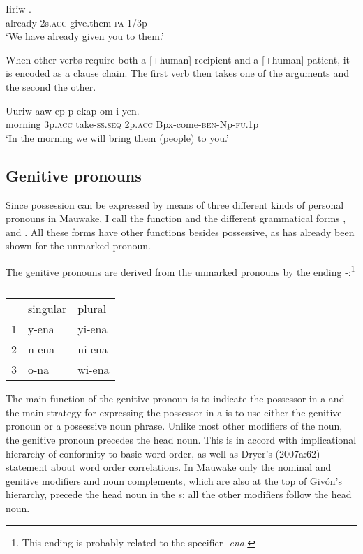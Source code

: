 \ea%
\label{ex:x565}
\gll Iiriw  . \\
already 2s.\textsc{acc} give.them-\textsc{pa}-1/3p\\
\glt`We have already given you to them.'
\z

When other verbs require both a [+human] recipient and a [+human] patient, it is encoded as a clause chain. The first verb then takes one of the arguments and the second the other.

\ea%
\label{ex:x566}
\gll Uuriw  aaw-ep  p-ekap-om-i-yen. \\
morning 3p.\textsc{acc} take-\textsc{ss}.\textsc{seq} 2p.\textsc{acc} Bpx-come-\textsc{ben}-Np-\textsc{fu}.1p\\
\glt`In the morning we will bring them (people) to you.'
\z

\subsection{Genitive pronouns}
{}
Since possession can be expressed by means of three different kinds of personal pronouns in Mauwake, I call the function  and the different grammatical forms , \textstyleDefinedWords{} and . All these forms have other functions besides possessive, as has already been shown for the unmarked pronoun. 

The genitive pronouns are derived from the unmarked pronouns by the ending \nobreakdash-:\footnote{This ending is probably related to the specifier -\textit{ena.}}

\begin{table}
\caption{}
\label{} 
\begin{tabular}{lll}
 &singular &plural\\
1 &y-ena &yi-ena\\
2 &n-ena &ni-ena\\
3 &o-na &wi-ena\\
\end{tabular}
\end{table}


The main function of the genitive pronoun is to indicate the possessor in a  and the main strategy for expressing the possessor in a  is to use either the genitive pronoun or a possessive noun phrase. Unlike most other modifiers of the noun, the genitive pronoun precedes the head noun. This is in accord with  implicational hierarchy of conformity to basic word order, as well as Dryer's (2007a:62) statement about word order correlations. In Mauwake only the nominal and genitive modifiers and noun complements, which are also at the top of Giv\'on's \citeyear{Givon1984} hierarchy, precede the head noun in the s; all the other modifiers follow the head noun.

